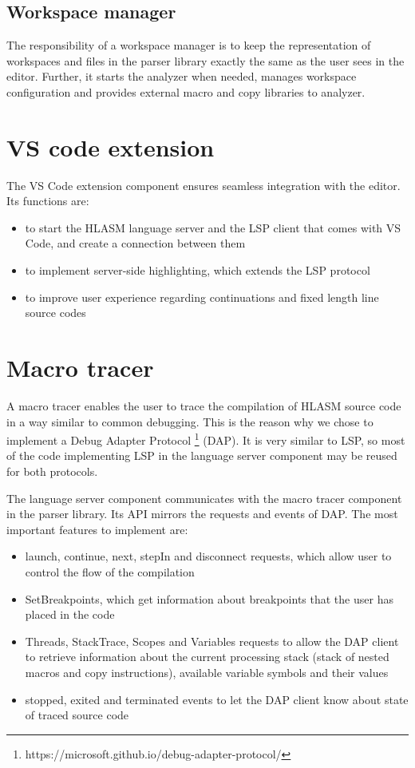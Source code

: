 \subsection{Workspace manager}

The responsibility of a workspace manager is to keep the representation of workspaces and files in the parser library exactly the same as the user sees in the editor. Further, it starts the analyzer when needed, manages workspace configuration and provides external macro and copy libraries to analyzer.

\section{VS code extension}

The VS Code extension component ensures seamless integration with the editor. Its functions are:

\begin{itemize}
	\item to start the HLASM language server and the LSP client that comes with VS Code, and create a connection between them
	\item to implement server-side highlighting, which extends the LSP protocol
	\item to improve user experience regarding continuations and fixed length line source codes
\end{itemize}


\section{Macro tracer}
A macro tracer enables the user to trace the compilation of HLASM source code in a way similar to common debugging. This is the reason why we chose to implement a Debug Adapter Protocol \footnote{https://microsoft.github.io/debug-adapter-protocol/} (DAP). It is very similar to LSP, so most of the code implementing LSP in the language server component may be reused for both protocols.

The language server component communicates with the macro tracer component in the parser library. Its API mirrors the requests and events of DAP. The most important features to implement are:

\begin{itemize}
	\item launch, continue, next, stepIn and disconnect requests, which allow user to control the flow of the compilation
	\item SetBreakpoints, which get information about breakpoints that the user has placed in the code
	\item Threads, StackTrace, Scopes and Variables requests to allow the DAP client to retrieve information about the current processing stack (stack of nested macros and copy instructions), available variable symbols and their values
	\item stopped, exited and terminated events to let the DAP client know about state of traced source code
\end{itemize}

